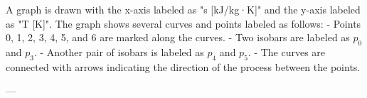 A graph is drawn with the x-axis labeled as "s [kJ/kg·K]" and the y-axis labeled as "T [K]". The graph shows several curves and points labeled as follows:  
- Points 0, 1, 2, 3, 4, 5, and 6 are marked along the curves.  
- Two isobars are labeled as \( p_0 \) and \( p_3 \).  
- Another pair of isobars is labeled as \( p_4 \) and \( p_5 \).  
- The curves are connected with arrows indicating the direction of the process between the points.  

---